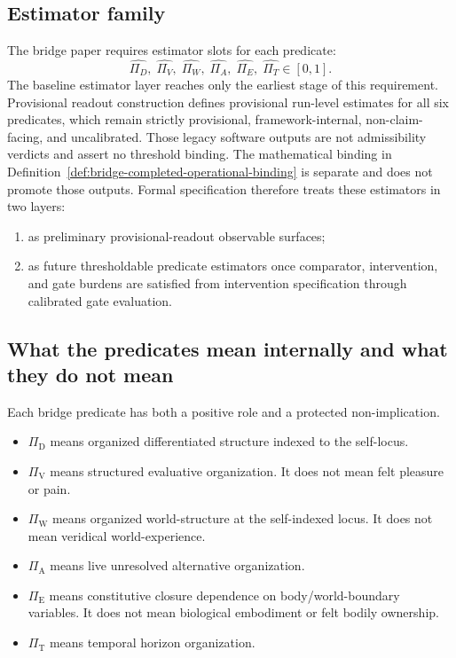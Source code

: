 \documentclass[11pt,a4paper]{article}
\theoremstyle{definition}
\newcommand{\PiD}{\Pi_{\mathrm{D}}}
\newcommand{\PiV}{\Pi_{\mathrm{V}}}
\newcommand{\PiW}{\Pi_{\mathrm{W}}}
\newcommand{\PiA}{\Pi_{\mathrm{A}}}
\newcommand{\PiE}{\Pi_{\mathrm{E}}}
\newcommand{\PiT}{\Pi_{\mathrm{T}}}
\begin{document}
\subsection{Estimator family}
The bridge paper requires estimator slots for each predicate:
\[
\widehat{\Pi_D},\;\widehat{\Pi_V},\;\widehat{\Pi_W},\;\widehat{\Pi_A},\;\widehat{\Pi_E},\;\widehat{\Pi_T}\in [0,1].
\]
The baseline estimator layer reaches only the earliest stage of this requirement. Provisional readout construction defines provisional run-level estimates for all six predicates, which remain strictly provisional, framework-internal, non-claim-facing, and uncalibrated. Those legacy software outputs are not admissibility verdicts and assert no threshold binding. The mathematical binding in Definition~\ref{def:bridge-completed-operational-binding} is separate and does not promote those outputs. Formal specification therefore treats these estimators in two layers:
\begin{enumerate}[leftmargin=1.5em]
\item as preliminary provisional-readout observable surfaces;
\item as future thresholdable predicate estimators once comparator, intervention, and gate burdens are satisfied from intervention specification through calibrated gate evaluation.
\end{enumerate}

\subsection{What the predicates mean internally and what they do not mean}
Each bridge predicate has both a positive role and a protected non-implication.
\begin{itemize}[leftmargin=1.5em]
\item $\PiD$ means organized differentiated structure indexed to the self-locus. 
\item $\PiV$ means structured evaluative organization. It does not mean felt pleasure or pain.
\item $\PiW$ means organized world-structure at the self-indexed locus. It does not mean veridical world-experience.
\item $\PiA$ means live unresolved alternative organization. 
\item $\PiE$ means constitutive closure dependence on body/world-boundary variables. It does not mean biological embodiment or felt bodily ownership.
\item $\PiT$ means temporal horizon organization. 
\end{itemize}
\end{document}
